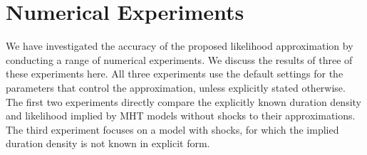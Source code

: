 
\section{Numerical Experiments}
\label{s:experiments}

We have investigated the accuracy of the proposed likelihood approximation by conducting a range of numerical experiments. We discuss the results of three of these experiments here. All three experiments use the default settings for the parameters that control the approximation, unless explicitly stated otherwise. The first two experiments directly compare the explicitly known duration density and likelihood implied by MHT models without shocks to their approximations. The third experiment focuses on a model with shocks, for which the implied duration density is not known in explicit form.

